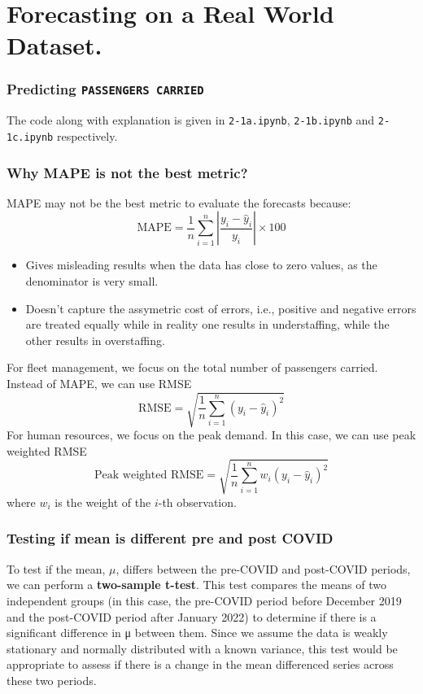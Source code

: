 \section{Forecasting on a Real World Dataset.}
\subsubsection{Predicting \texttt{PASSENGERS CARRIED}}
The code along with explanation is given in \texttt{2-1a.ipynb}, \texttt{2-1b.ipynb} and \texttt{2-1c.ipynb} respectively.

\subsubsection{Why MAPE is not the best metric?}
MAPE may not be the best metric to evaluate the forecasts because:
\[\text{MAPE} = \frac{1}{n} \sum_{i=1}^{n} \left| \frac{y_i - \hat{y}_i}{y_i} \right| \times 100\]
\begin{itemize}
	\item Gives misleading results when the data has close to zero values, as the denominator is very small.
	\item Doesn't capture the assymetric cost of errors, i.e., positive and negative errors are treated equally while in reality one results in understaffing, while the other results in overstaffing.
\end{itemize}

For fleet management, we focus on the total number of passengers carried. Instead of MAPE, we can use RMSE
\[\text{RMSE} = \sqrt{\frac{1}{n} \sum_{i=1}^{n} (y_i - \hat{y}_i)^2}\]
For human resources, we focus on the peak demand. In this case, we can use peak weighted RMSE
\[ \text{Peak weighted RMSE} = \sqrt{\frac{1}{n} \sum_{i=1}^{n} w_i (y_i - \hat{y}_i)^2}\]
where $w_i$ is the weight of the $i$-th observation.

\subsubsection{Testing if mean is different pre and post COVID}
To test if the mean, $\mu$, differs between the pre-COVID and post-COVID periods,
we can perform a \textbf{two-sample t-test}. This test compares the means of two independent groups (in this case, the pre-COVID period before December 2019 and the post-COVID period after January 2022) to determine if there is a significant difference in μ between them.
Since we assume the data is weakly stationary and normally distributed with a known variance,
this test would be appropriate to assess if there is a change in the mean differenced series across these two periods.
